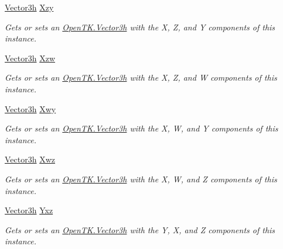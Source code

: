 \begin{DoxyCompactItemize}
\hyperlink{struct_open_t_k_1_1_vector3h}{Vector3h} \hyperlink{struct_open_t_k_1_1_vector4h_a36238fc35085e4ce28a17085365ac5dc}{Xzy}
\begin{DoxyCompactList}\small\item\em Gets or sets an \hyperlink{struct_open_t_k_1_1_vector3h}{Open\-T\-K.\-Vector3h} with the X, Z, and Y components of this instance. \end{DoxyCompactList}\item 
\hyperlink{struct_open_t_k_1_1_vector3h}{Vector3h} \hyperlink{struct_open_t_k_1_1_vector4h_afaf3da5127bcdff5596c17ad34c3f8c9}{Xzw}
\begin{DoxyCompactList}\small\item\em Gets or sets an \hyperlink{struct_open_t_k_1_1_vector3h}{Open\-T\-K.\-Vector3h} with the X, Z, and W components of this instance. \end{DoxyCompactList}\item 
\hyperlink{struct_open_t_k_1_1_vector3h}{Vector3h} \hyperlink{struct_open_t_k_1_1_vector4h_a8682bb52aff40a71f1178ce757eae07d}{Xwy}
\begin{DoxyCompactList}\small\item\em Gets or sets an \hyperlink{struct_open_t_k_1_1_vector3h}{Open\-T\-K.\-Vector3h} with the X, W, and Y components of this instance. \end{DoxyCompactList}\item 
\hyperlink{struct_open_t_k_1_1_vector3h}{Vector3h} \hyperlink{struct_open_t_k_1_1_vector4h_a19a56a623828a8d44cd9ac19f9178c77}{Xwz}
\begin{DoxyCompactList}\small\item\em Gets or sets an \hyperlink{struct_open_t_k_1_1_vector3h}{Open\-T\-K.\-Vector3h} with the X, W, and Z components of this instance. \end{DoxyCompactList}\item 
\hyperlink{struct_open_t_k_1_1_vector3h}{Vector3h} \hyperlink{struct_open_t_k_1_1_vector4h_ab892c33ba866ad9e03760bd1d1628d84}{Yxz}
\begin{DoxyCompactList}\small\item\em Gets or sets an \hyperlink{struct_open_t_k_1_1_vector3h}{Open\-T\-K.\-Vector3h} with the Y, X, and Z components of this instance. \end{DoxyCompactList}\item 

\end{DoxyCompactItemize}
